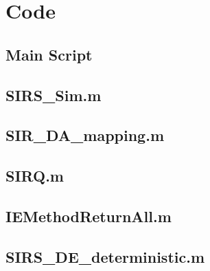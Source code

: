 \documentclass{/home/janmebows/Documents/LatexTemplates/myassignment}
\begin{document}
\clearpage
\appendix
\section{Code}
\label{code:main}
\subsection{Main Script}


\label{code:SIRSsim}
\subsection{SIRS\_Sim.m}


\label{code:DAmap}
\subsection{SIR\_DA\_mapping.m}


\label{code:Qmat}
\subsection{SIRQ.m}


\label{code:IEMethodReturnAll}
\subsection{IEMethodReturnAll.m}


\label{code:deterministic}
\subsection{SIRS\_DE\_deterministic.m}

	



\clearpage

\end{document}
